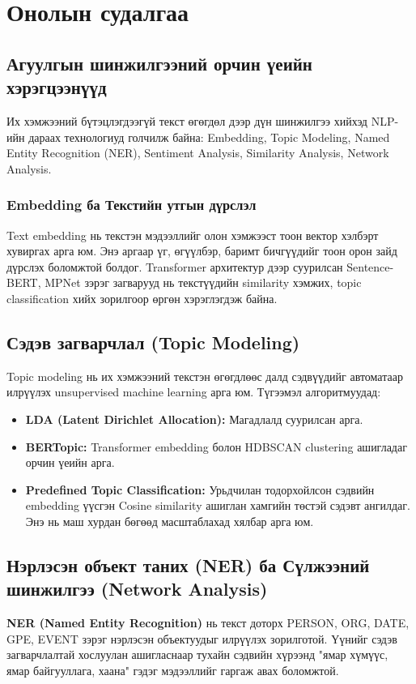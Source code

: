\chapter{Онолын судалгаа}

\section{Агуулгын шинжилгээний орчин үеийн хэрэгцээнүүд}
Их хэмжээний бүтэцлэгдээгүй текст өгөгдөл дээр дүн шинжилгээ хийхэд NLP-ийн дараах технологиуд голчилж байна: Embedding, Topic Modeling, Named Entity Recognition (NER), Sentiment Analysis, Similarity Analysis, Network Analysis. 

\subsection{Embedding ба Текстийн утгын дүрслэл}
Text embedding нь текстэн мэдээллийг олон хэмжээст тоон вектор хэлбэрт хувиргах арга юм. Энэ аргаар үг, өгүүлбэр, баримт бичгүүдийг тоон орон зайд дүрслэх боломжтой болдог. Transformer архитектур дээр суурилсан Sentence-BERT, MPNet зэрэг загварууд нь текстүүдийн similarity хэмжих, topic classification хийх зорилгоор өргөн хэрэглэгдэж байна. 

\section{Сэдэв загварчлал (Topic Modeling)}
Topic modeling нь их хэмжээний текстэн өгөгдлөөс далд сэдвүүдийг автоматаар илрүүлэх unsupervised machine learning арга юм. Түгээмэл алгоритмуудад:
\begin{itemize}
    \item \textbf{LDA (Latent Dirichlet Allocation):} Магадлалд суурилсан арга. 
    \item \textbf{BERTopic:} Transformer embedding болон HDBSCAN clustering ашигладаг орчин үеийн арга.
    \item \textbf{Predefined Topic Classification:} Урьдчилан тодорхойлсон сэдвийн embedding үүсгэн Cosine similarity ашиглан хамгийн төстэй сэдэвт ангилдаг. Энэ нь маш хурдан бөгөөд масштаблахад хялбар арга юм.
\end{itemize}

\section{Нэрлэсэн объект таних (NER) ба Сүлжээний шинжилгээ (Network Analysis)}
\textbf{NER (Named Entity Recognition)} нь текст доторх PERSON, ORG, DATE, GPE, EVENT зэрэг нэрлэсэн объектуудыг илрүүлэх зорилготой. Үүнийг сэдэв загварчлалтай хослуулан ашигласнаар тухайн сэдвийн хүрээнд "ямар хүмүүс, ямар байгууллага, хаана" гэдэг мэдээллийг гаргаж авах боломжтой.

